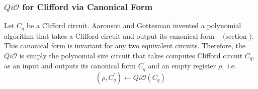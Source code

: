 \subsubsection{$Qi\mathcal{O}$ for Clifford via Canonical Form}
\label{sec:Clifford-iO-canonical}
Let $C_q$ be a Clifford circuit. 
Aaronson and Gottesman invented a polynomial algorithm that takes a Clifford circuit and output its canonical form ~\cite{AG04} (section ). This canonical form is invariant for any two equivalent circuits. Therefore, the $Qi\mathcal{O}$ is simply the polynomial size circuit  that takes computes Clifford circuit $C_q,$ as an input and outputs its canonical form $C_q^\prime$ and an empty register $\rho,$ i.e.
														$$  (\rho, C_q^\prime)\leftarrow Qi\mathcal{O}(C_q)$$
                                                 


